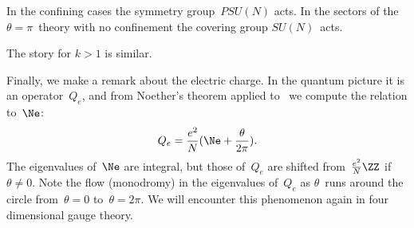 In the confining cases the symmetry group~$PSU(N)$ acts.  In the sectors of
the $\theta =\pi $~theory with no confinement the covering group
$SU(N)$~acts.   
 
The story for $k>1$ is similar.

Finally, we make a remark about the electric charge.  In the quantum picture
it is an operator~$Q_e$, and from Noether's theorem applied to~ we
compute the relation to~$\Ne$: 
  $$ Q_e = \frac{e^2}{N}(\Ne+\frac{\theta }{2\pi }).  $$
The eigenvalues of~$\Ne$ are integral, but those of~$Q_e$ are shifted
from~$\frac{e^2}{N}\ZZ$ if~$\theta \not= 0$.  Note the flow (monodromy) in
the eigenvalues of~$Q_e$ as $\theta $~runs around the circle from~$\theta =0$
to~$\theta =2\pi $.  We will encounter this phenomenon again in four
dimensional gauge theory.


\enddocument
